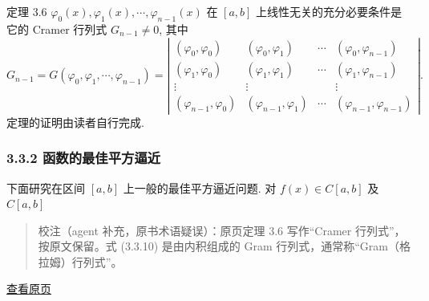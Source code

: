 \documentclass[
  10pt,
  fontset=fandol]{ctexart}
\begin{document}
定理 3.6 \(\varphi_0(x), \varphi_1(x), \cdots, \varphi_{n-1}(x)\) 在 \([a,b]\) 上线性无关的充分必要条件是它的 Cramer 行列式 \(G_{n-1} \neq 0\), 其中 \[
G_{n-1} = G(\varphi_0, \varphi_1, \cdots, \varphi_{n-1}) = \left| \begin{array}{cccc} (\varphi_0, \varphi_0) & (\varphi_0, \varphi_1) & \cdots & (\varphi_0, \varphi_{n-1}) \\ (\varphi_1, \varphi_0) & (\varphi_1, \varphi_1) & \cdots & (\varphi_1, \varphi_{n-1}) \\ \vdots & \vdots & & \vdots \\ (\varphi_{n-1}, \varphi_0) & (\varphi_{n-1}, \varphi_1) & \cdots & (\varphi_{n-1}, \varphi_{n-1}) \end{array} \right|. \tag{3.3.10}
\] 定理的证明由读者自行完成.

\subsubsection{3.3.2 函数的最佳平方逼近}\label{ux51fdux6570ux7684ux6700ux4f73ux5e73ux65b9ux903cux8fd1}

下面研究在区间 \([a,b]\) 上一般的最佳平方逼近问题. 对 \(f(x) \in C[a,b]\) 及 \(C[a,b]\)

\begin{quote}
校注（agent 补充，原书术语疑误）：原页定理 3.6 写作``Cramer 行列式''，按原文保留。式 (3.3.10) 是由内积组成的 Gram 行列式，通常称``Gram（格拉姆）行列式''。
\end{quote}

\href{../../source-images/pdf-068.jpeg}{查看原页}
\end{document}
